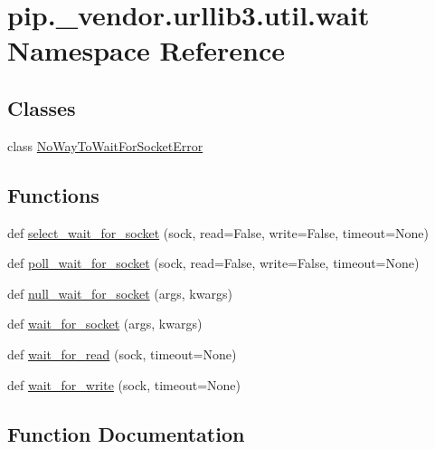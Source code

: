 \hypertarget{namespacepip_1_1__vendor_1_1urllib3_1_1util_1_1wait}{}\section{pip.\+\_\+vendor.\+urllib3.\+util.\+wait Namespace Reference}
\label{namespacepip_1_1__vendor_1_1urllib3_1_1util_1_1wait}
\subsection*{Classes}
\begin{DoxyCompactItemize}
\item 
class \hyperlink{classpip_1_1__vendor_1_1urllib3_1_1util_1_1wait_1_1NoWayToWaitForSocketError}{No\+Way\+To\+Wait\+For\+Socket\+Error}
\end{DoxyCompactItemize}
\subsection*{Functions}
\begin{DoxyCompactItemize}
\item 
def \hyperlink{namespacepip_1_1__vendor_1_1urllib3_1_1util_1_1wait_a66900b50f2515408b887ee4b1a494ac5}{select\+\_\+wait\+\_\+for\+\_\+socket} (sock, read=False, write=False, timeout=None)
\item 
def \hyperlink{namespacepip_1_1__vendor_1_1urllib3_1_1util_1_1wait_af4c3d7332c80255eabb29ee6a1c3deb1}{poll\+\_\+wait\+\_\+for\+\_\+socket} (sock, read=False, write=False, timeout=None)
\item 
def \hyperlink{namespacepip_1_1__vendor_1_1urllib3_1_1util_1_1wait_a8a6b26dae98894bd4ecee944c17b9f71}{null\+\_\+wait\+\_\+for\+\_\+socket} (args, kwargs)
\item 
def \hyperlink{namespacepip_1_1__vendor_1_1urllib3_1_1util_1_1wait_a076a604a8a92c582fdf376129e061d12}{wait\+\_\+for\+\_\+socket} (args, kwargs)
\item 
def \hyperlink{namespacepip_1_1__vendor_1_1urllib3_1_1util_1_1wait_a9a78bee5b18ad044796c592a9d18be5f}{wait\+\_\+for\+\_\+read} (sock, timeout=None)
\item 
def \hyperlink{namespacepip_1_1__vendor_1_1urllib3_1_1util_1_1wait_a0c5f8e9a88d1627e136d982a8f47935c}{wait\+\_\+for\+\_\+write} (sock, timeout=None)
\end{DoxyCompactItemize}


\subsection{Function Documentation}
\mbox{\label{namespacepip_1_1__vendor_1_1urllib3_1_1util_1_1wait_a8a6b26dae98894bd4ecee944c17b9f71}} 
